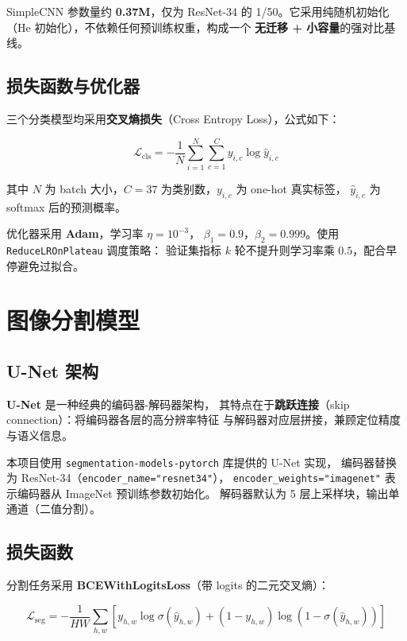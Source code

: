 \documentclass[12pt, a4paper, openany]{ctexbook}
\begin{document}
SimpleCNN 参数量约 \textbf{0.37M}，仅为 ResNet-34 的 1/50。它采用纯随机初始化
（He\cite{he2015kaiming} 初始化），不依赖任何预训练权重，构成一个
\textbf{无迁移 + 小容量}的强对比基线。

\subsection{损失函数与优化器}

三个分类模型均采用\textbf{交叉熵损失}（Cross Entropy Loss），公式如下：

\begin{equation}
  \mathcal{L}_{\text{cls}} = -\frac{1}{N}\sum_{i=1}^{N}\sum_{c=1}^{C}
    y_{i,c} \log \hat{y}_{i,c}
\end{equation}

其中 $N$ 为 batch 大小，$C = 37$ 为类别数，$y_{i,c}$ 为 one-hot 真实标签，
$\hat{y}_{i,c}$ 为 softmax 后的预测概率。

优化器采用 \textbf{Adam}\cite{kingma2014adam}，学习率 $\eta = 10^{-3}$，
$\beta_1 = 0.9$，$\beta_2 = 0.999$。使用 \texttt{ReduceLROnPlateau} 调度策略：
验证集指标 $k$ 轮不提升则学习率乘 $0.5$，配合早停避免过拟合。

\section{图像分割模型}

\subsection{U-Net 架构}

\textbf{U-Net}\cite{ronneberger2015unet} 是一种经典的编码器-解码器架构，
其特点在于\textbf{跳跃连接}（skip connection）：将编码器各层的高分辨率特征
与解码器对应层拼接，兼顾定位精度与语义信息。

本项目使用 \texttt{segmentation-models-pytorch} 库提供的 U-Net 实现，
编码器替换为 ResNet-34（\texttt{encoder\_name="resnet34"}），
\texttt{encoder\_weights="imagenet"} 表示编码器从 ImageNet 预训练参数初始化。
解码器默认为 5 层上采样块，输出单通道（二值分割）。

\subsection{损失函数}

分割任务采用 \textbf{BCEWithLogitsLoss}（带 logits 的二元交叉熵）：

\begin{equation}
  \mathcal{L}_{\text{seg}} = -\frac{1}{HW}\sum_{h,w}
    \left[
      y_{h,w} \log \sigma(\hat{y}_{h,w}) +
      (1 - y_{h,w}) \log (1 - \sigma(\hat{y}_{h,w}))
    \right]
\end{equation}
\end{document}
